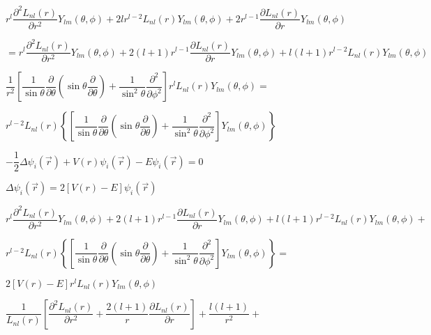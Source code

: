 \documentclass{jarticle}%
\begin{document}
$r^{l}\dfrac{\partial^{2}L_{nl}\left(  r\right)  }{\partial r^{2}}%
Y_{lm}\left(  \theta,\phi\right)  +2lr^{l-2}L_{nl}\left(  r\right)
Y_{lm}\left(  \theta,\phi\right)  +2r^{l-1}\dfrac{\partial L_{nl}\left(
r\right)  }{\partial r}Y_{lm}\left(  \theta,\phi\right)  $

$=r^{l}\dfrac{\partial^{2}L_{nl}\left(  r\right)  }{\partial r^{2}}%
Y_{lm}\left(  \theta,\phi\right)  +2\left(  l+1\right)  r^{l-1}\dfrac{\partial
L_{nl}\left(  r\right)  }{\partial r}Y_{lm}\left(  \theta,\phi\right)
+l\left(  l+1\right)  r^{l-2}L_{nl}\left(  r\right)  Y_{lm}\left(  \theta
,\phi\right)  $

$\dfrac{1}{r^{2}}\left[  \dfrac{1}{\sin\theta}\dfrac{\partial}{\partial\theta
}\left(  \sin\theta\dfrac{\partial}{\partial\theta}\right)  +\dfrac{1}%
{\sin^{2}\theta}\dfrac{\partial^{2}}{\partial\phi^{2}}\right]  r^{l}%
L_{nl}\left(  r\right)  Y_{lm}\left(  \theta,\phi\right)  =$

$r^{l-2}L_{nl}\left(  r\right)  \left\{  \left[  \dfrac{1}{\sin\theta}%
\dfrac{\partial}{\partial\theta}\left(  \sin\theta\dfrac{\partial}%
{\partial\theta}\right)  +\dfrac{1}{\sin^{2}\theta}\dfrac{\partial^{2}%
}{\partial\phi^{2}}\right]  Y_{lm}\left(  \theta,\phi\right)  \right\}  $

$-\dfrac{1}{2}\Delta\psi_{i}\left(  \vec{r}\right)  +V\left(  r\right)
\psi_{i}\left(  \vec{r}\right)  -E\psi_{i}\left(  \vec{r}\right)  =0$

$\Delta\psi_{i}\left(  \vec{r}\right)  =2\left[  V\left(  r\right)  -E\right]
\psi_{i}\left(  \vec{r}\right)  $

$r^{l}\dfrac{\partial^{2}L_{nl}\left(  r\right)  }{\partial r^{2}}%
Y_{lm}\left(  \theta,\phi\right)  +2\left(  l+1\right)  r^{l-1}\dfrac{\partial
L_{nl}\left(  r\right)  }{\partial r}Y_{lm}\left(  \theta,\phi\right)
+l\left(  l+1\right)  r^{l-2}L_{nl}\left(  r\right)  Y_{lm}\left(  \theta
,\phi\right)  +$

$r^{l-2}L_{nl}\left(  r\right)  \left\{  \left[  \dfrac{1}{\sin\theta}%
\dfrac{\partial}{\partial\theta}\left(  \sin\theta\dfrac{\partial}%
{\partial\theta}\right)  +\dfrac{1}{\sin^{2}\theta}\dfrac{\partial^{2}%
}{\partial\phi^{2}}\right]  Y_{lm}\left(  \theta,\phi\right)  \right\}  =$

$2\left[  V\left(  r\right)  -E\right]  r^{l}L_{nl}\left(  r\right)
Y_{lm}\left(  \theta,\phi\right)  $

$\dfrac{1}{L_{nl}\left(  r\right)  }\left[  \dfrac{\partial^{2}L_{nl}\left(
r\right)  }{\partial r^{2}}+\dfrac{2\left(  l+1\right)  }{r}\dfrac{\partial
L_{nl}\left(  r\right)  }{\partial r}\right]  +\dfrac{l\left(  l+1\right)
}{r^{2}}+$
\end{document}
